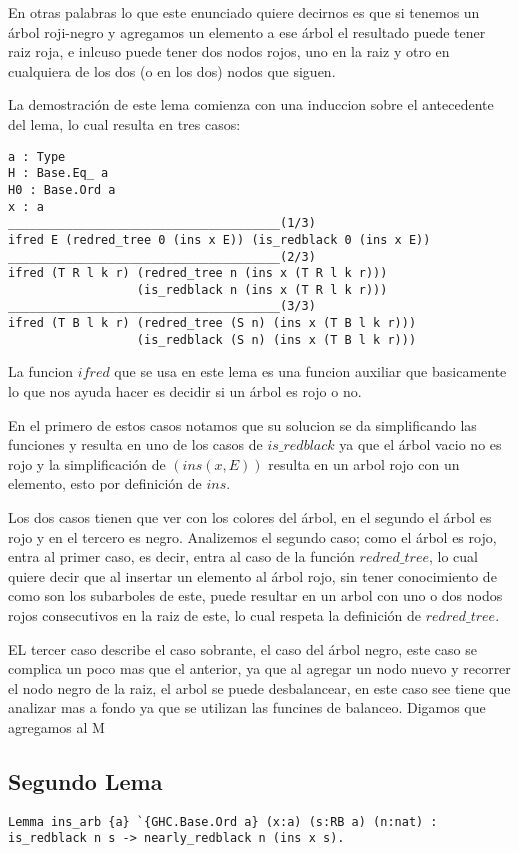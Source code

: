 \documentclass[letterpaper,12pt,oneside]{book}
\newcommand{\arn}{árbol roji-negro }
\begin{document}
 En otras palabras lo que este enunciado quiere decirnos es que si tenemos un \arn y agregamos un elemento a ese \'arbol
 el resultado puede tener raiz roja, e inlcuso puede tener dos nodos rojos, uno en la raiz y otro en cualquiera de los dos
 (o en los dos) nodos que siguen.

 La demostraci\'on de este lema comienza con una induccion sobre el antecedente del lema, lo cual resulta en tres casos:
 \begin{verbatim}
a : Type
H : Base.Eq_ a
H0 : Base.Ord a
x : a
______________________________________(1/3)
ifred E (redred_tree 0 (ins x E)) (is_redblack 0 (ins x E))
______________________________________(2/3)
ifred (T R l k r) (redred_tree n (ins x (T R l k r))) 
                  (is_redblack n (ins x (T R l k r)))
______________________________________(3/3)
ifred (T B l k r) (redred_tree (S n) (ins x (T B l k r)))
                  (is_redblack (S n) (ins x (T B l k r)))
 \end{verbatim}

 La funcion $ifred$ que se usa en este lema es una funcion auxiliar que basicamente lo que nos ayuda hacer es decidir si un \'arbol es 
 rojo o no. 

 En el primero de estos casos notamos que su solucion se da simplificando las funciones y resulta en uno de los casos
 de $is\_redblack$ ya que el \'arbol vacio no es rojo y la simplificaci\'on de $(ins(x,E))$ resulta en un arbol rojo con un elemento,
 esto por definici\'on de $ins$.

 Los dos casos tienen que ver con los colores del \'arbol, en el segundo el \'arbol es rojo y en el tercero es negro.
 Analizemos el segundo caso; como el \'arbol es rojo, entra al primer caso, es decir, entra al caso de la funci\'on $redred\_tree$,
 lo cual quiere decir que al insertar un elemento al \'arbol rojo, sin tener conocimiento de como son los subarboles de este, puede
 resultar en un arbol con uno o dos nodos rojos consecutivos en la raiz de este, lo cual respeta la definici\'on de $redred\_tree$.

 EL tercer caso describe el caso sobrante, el caso del \'arbol negro, este caso se complica un poco mas que el anterior, ya que al 
 agregar un nodo nuevo y recorrer el nodo negro de la raiz, el arbol se puede desbalancear, en este caso see tiene que analizar mas a fondo 
 ya que se utilizan las funcines de balanceo. Digamos que agregamos al M
\subsection{Segundo Lema}
\begin{verbatim}
Lemma ins_arb {a} `{GHC.Base.Ord a} (x:a) (s:RB a) (n:nat) : 
is_redblack n s -> nearly_redblack n (ins x s).
\end{verbatim}
\end{document}
